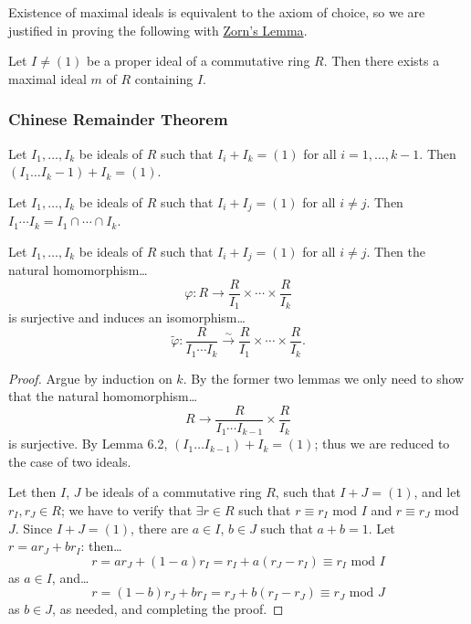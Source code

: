 \noindent Existence of maximal ideals is equivalent to the axiom of choice, so we are justified in proving the following with \hyperref[zornslemma]{Zorn's Lemma}.

\begin{proposition}
Let $I \neq (1)$ be a proper ideal of a commutative ring $R$. Then there exists a maximal ideal $m$ of $R$ containing $I$.
\end{proposition}

\subsubsection{Chinese Remainder Theorem}\label{chineseremaindertheorem}

\begin{lemma}
Let $I_1,\dots,I_k$ be ideals of $R$ such that $I_i + I_k = (1)$ for all $i = 1,\dots,k-1$. Then $(I_1\dots I_k-1) + I_k = (1)$.
\end{lemma}

\begin{lemma}
Let $I_1,\dots,I_k$ be ideals of $R$ such that $I_i + I_j = (1)$ for all $i \neq j$. Then $I_1 \cdots I_k = I_1 \cap \cdots \cap I_k$.
\end{lemma}

\begin{theorem}
\label{crt}
Let $I_1, \dots, I_k$ be ideals of $R$ such that $I_i + I_j = (1)$ for all $i \neq j$. Then the natural homomorphism\dots
$$\varphi : R \rightarrow \frac{R}{I_1} \times \cdots \times \frac{R}{I_k}$$
is surjective and induces an isomorphism\dots
$$\tilde \varphi : \frac{R}{I_1 \cdots I_k} \xrightarrow[]{\sim} \frac{R}{I_1} \times \cdots \times \frac{R}{I_k}.$$
\end{theorem}

\begin{proof}
Argue by induction on $k$. By the former two lemmas we only need to show that the natural homomorphism\dots
$$R \rightarrow \frac{R}{I_1\cdots I_{k-1}}\times\frac{R}{I_k}$$
is surjective. By Lemma 6.2, $(I_1 \dots I_{k-1}) + I_k = (1)$; thus we are reduced to the case of two ideals.

Let then $I$, $J$ be ideals of a commutative ring $R$, such that $I + J = (1)$, and let $r_I, r_J \in R$; we have to verify that
$\exists r \in R$ such that $r \equiv r_I$ mod $I$ and $r \equiv r_J$ mod $J$. Since $I + J = (1)$, there are $a \in I$, $b \in J$
such that $a + b = 1$. Let $r = ar_J + br_I$: then\dots
$$r = ar_J + (1-a)r_I = r_I + a(r_J - r_I) \equiv r_I \textrm{ mod } I$$
as $a \in I$, and\dots
$$r = (1-b)r_J + br_I = r_J + b(r_I - r_J) \equiv r_J \textrm{ mod } J$$
as $b \in J$, as needed, and completing the proof.
\end{proof}